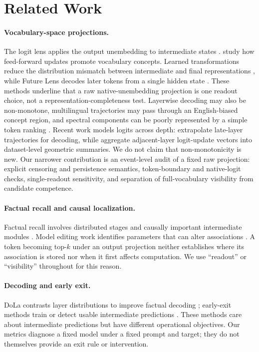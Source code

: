 \documentclass[11pt]{article}
\begin{document}
\section{Related Work}
\paragraph{Vocabulary-space projections.}
The logit lens applies the output unembedding to intermediate states \citep{nostalgebraist2020logitlens}. \citet{geva2022transformer} study how feed-forward updates promote vocabulary concepts. Learned transformations reduce the distribution mismatch between intermediate and final representations \citep{belrose2023tuned,yomdin2024jump}, while Future Lens decodes later tokens from a single hidden state \citep{pal2023future}. These methods underline that a raw native-unembedding projection is one readout choice, not a representation-completeness test. Layerwise decoding may also be non-monotone, multilingual trajectories may pass through an English-biased concept region, and spectral components can be poorly represented by a simple token ranking \citep{wendler2024llamas,cancedda2024spectral,nguyen2026iglens}. Recent work models logits across depth: \citet{he2025delta} extrapolate late-layer trajectories for decoding, while \citet{jung2026tracing} aggregate adjacent-layer logit-update vectors into dataset-level geometric summaries. We do not claim that non-monotonicity is new. Our narrower contribution is an event-level audit of a fixed raw projection: explicit censoring and persistence semantics, token-boundary and native-logit checks, single-readout sensitivity, and separation of full-vocabulary visibility from candidate competence.

\paragraph{Factual recall and causal localization.}
Factual recall involves distributed stages and causally important intermediate modules \citep{meng2022locating,geva2023dissecting}. Model editing work identifies parameters that can alter associations \citep{meng2022mass}. A token becoming top-$k$ under an output projection neither establishes where its association is stored nor when it first affects computation. We use ``readout'' or ``visibility'' throughout for this reason.

\paragraph{Decoding and early exit.}
DoLa contrasts layer distributions to improve factual decoding \citep{chuang2024dola}; early-exit methods train or detect usable intermediate predictions \citep{elhoushi2024layerskip}. These methods care about intermediate predictions but have different operational objectives. Our metrics diagnose a fixed model under a fixed prompt and target; they do not themselves provide an exit rule or intervention.
\end{document}
